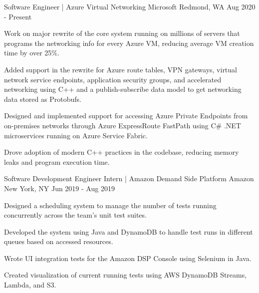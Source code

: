 

\begin{cventries}

  \cventry
  {Software Engineer | Azure Virtual Networking} %
  {Microsoft} %
  {Redmond, WA} %
  {Aug 2020 - Present} %
  {
    \begin{cvitems} %
      \item {Work on major rewrite of the core system running on millions of servers that programs the networking info for every Azure VM, reducing average VM creation time by over 25\%.}
      \item {Added support in the rewrite for Azure route tables, VPN gateways, virtual network service endpoints, application security groups, and accelerated networking using C++ and a publish-subscribe data model to get networking data stored as Protobufs.}
      \item {Designed and implemented support for accessing Azure Private Endpoints from on-premises networks through Azure ExpressRoute FastPath using C\# .NET microservices running on Azure Service Fabric.}
      \item {Drove adoption of modern C++ practices in the codebase, reducing memory leaks and program execution time.}
    \end{cvitems}
  }

  \cventry
  {Software Development Engineer Intern | Amazon Demand Side Platform} %
  {Amazon} %
  {New York, NY} %
  {Jun 2019 - Aug 2019} %
  {
    \begin{cvitems} %
      \item {Designed a scheduling system to manage the number of tests running concurrently across the team's unit test suites.}
      \item {Developed the system using Java and DynamoDB to handle test runs in different queues based on accessed resources.}
      \item {Wrote UI integration tests for the Amazon DSP Console using Selenium in Java.}
      \item {Created visualization of current running tests using AWS DynamoDB Streams, Lambda, and S3.}
    \end{cvitems}
  }


\end{cventries}
